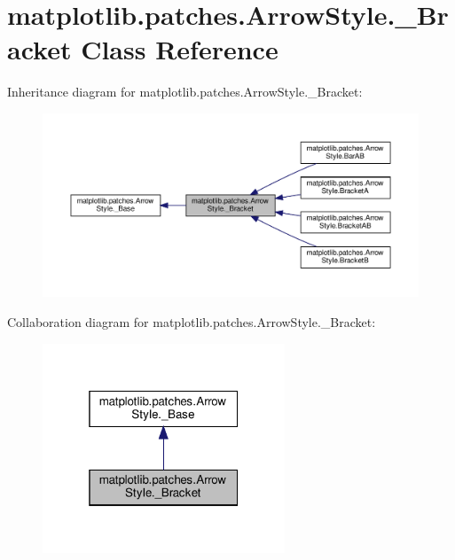 \hypertarget{classmatplotlib_1_1patches_1_1ArrowStyle_1_1__Bracket}{}\section{matplotlib.\+patches.\+Arrow\+Style.\+\_\+\+Bracket Class Reference}
\label{classmatplotlib_1_1patches_1_1ArrowStyle_1_1__Bracket}


Inheritance diagram for matplotlib.\+patches.\+Arrow\+Style.\+\_\+\+Bracket\+:
\nopagebreak
\begin{figure}[H]
\begin{center}
\leavevmode
\includegraphics[width=350pt]{classmatplotlib_1_1patches_1_1ArrowStyle_1_1__Bracket__inherit__graph}
\end{center}
\end{figure}


Collaboration diagram for matplotlib.\+patches.\+Arrow\+Style.\+\_\+\+Bracket\+:
\nopagebreak
\begin{figure}[H]
\begin{center}
\leavevmode
\includegraphics[width=205pt]{classmatplotlib_1_1patches_1_1ArrowStyle_1_1__Bracket__coll__graph}
\end{center}
\end{figure}
